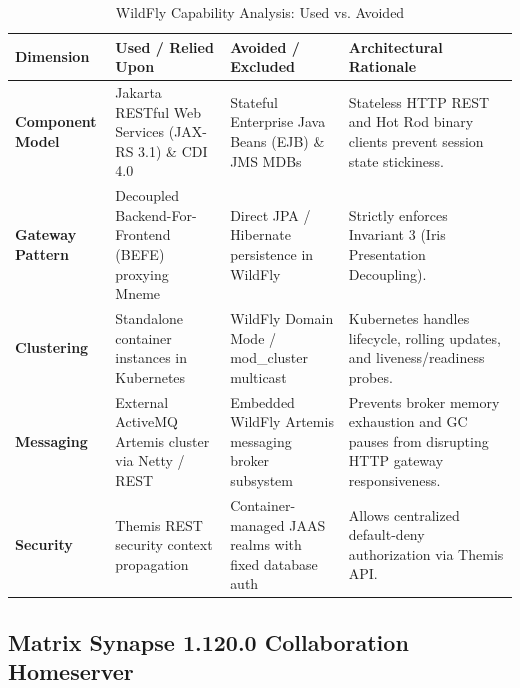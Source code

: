 \begin{table}[htbp]
\centering
\scriptsize
\begin{tabularx}{\textwidth}{P{3.0cm} P{3.8cm} P{3.8cm} Y}
\toprule
\textbf{Dimension} & \textbf{Used / Relied Upon} & \textbf{Avoided / Excluded} & \textbf{Architectural Rationale} \\
\midrule
\textbf{Component Model} & Jakarta RESTful Web Services (JAX-RS 3.1) \& CDI 4.0 & Stateful Enterprise Java Beans (EJB) \& JMS MDBs & Stateless HTTP REST and Hot Rod binary clients prevent session state stickiness. \\
\addlinespace
\textbf{Gateway Pattern} & Decoupled Backend-For-Frontend (BEFE) proxying Mneme & Direct JPA / Hibernate persistence in WildFly & Strictly enforces Invariant 3 (Iris Presentation Decoupling). \\
\addlinespace
\textbf{Clustering} & Standalone container instances in Kubernetes & WildFly Domain Mode / mod\_cluster multicast & Kubernetes handles lifecycle, rolling updates, and liveness/readiness probes. \\
\addlinespace
\textbf{Messaging} & External ActiveMQ Artemis cluster via Netty / REST & Embedded WildFly Artemis messaging broker subsystem & Prevents broker memory exhaustion and GC pauses from disrupting HTTP gateway responsiveness. \\
\addlinespace
\textbf{Security} & Themis REST security context propagation & Container-managed JAAS realms with fixed database auth & Allows centralized default-deny authorization via Themis API. \\
\bottomrule
\end{tabularx}
\caption{WildFly Capability Analysis: Used vs. Avoided}
\label{tab:wildfly_used_vs_avoided}
\end{table}

\subsection{Matrix Synapse 1.120.0 Collaboration Homeserver}


